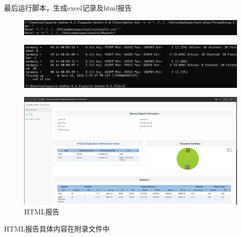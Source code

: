 \documentclass[hyperref,a4paper,UTF8]{ctexart}
\begin{document}
最后运行脚本，生成excel记录及html报告
\begin{figure}[H]
    \centering
    \includegraphics[width=0.75\linewidth]{测试/6.png}
    \label{fig:enter-label}
\end{figure}
\begin{figure}[H]
    \centering
    \includegraphics[width=0.75\linewidth]{测试/7e.png}
    \label{fig:enter-label}
\end{figure}
\begin{figure}[H]
    \centering
    \includegraphics[width=0.75\linewidth]{html.png}
    \caption{HTML报告}
    \label{fig:enter-label}
\end{figure}
HTML报告具体内容在附录文件中
\end{document}
